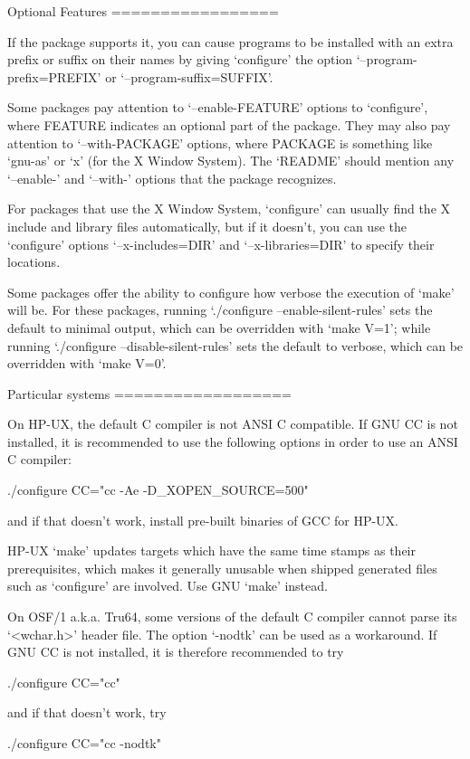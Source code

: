 \begin{DoxyVerbInclude}
Optional Features
=================

   If the package supports it, you can cause programs to be installed
with an extra prefix or suffix on their names by giving `configure' the
option `--program-prefix=PREFIX' or `--program-suffix=SUFFIX'.

   Some packages pay attention to `--enable-FEATURE' options to
`configure', where FEATURE indicates an optional part of the package.
They may also pay attention to `--with-PACKAGE' options, where PACKAGE
is something like `gnu-as' or `x' (for the X Window System).  The
`README' should mention any `--enable-' and `--with-' options that the
package recognizes.

   For packages that use the X Window System, `configure' can usually
find the X include and library files automatically, but if it doesn't,
you can use the `configure' options `--x-includes=DIR' and
`--x-libraries=DIR' to specify their locations.

   Some packages offer the ability to configure how verbose the
execution of `make' will be.  For these packages, running `./configure
--enable-silent-rules' sets the default to minimal output, which can be
overridden with `make V=1'; while running `./configure
--disable-silent-rules' sets the default to verbose, which can be
overridden with `make V=0'.

Particular systems
==================

   On HP-UX, the default C compiler is not ANSI C compatible.  If GNU
CC is not installed, it is recommended to use the following options in
order to use an ANSI C compiler:

     ./configure CC="cc -Ae -D_XOPEN_SOURCE=500"

and if that doesn't work, install pre-built binaries of GCC for HP-UX.

   HP-UX `make' updates targets which have the same time stamps as
their prerequisites, which makes it generally unusable when shipped
generated files such as `configure' are involved.  Use GNU `make'
instead.

   On OSF/1 a.k.a. Tru64, some versions of the default C compiler cannot
parse its `<wchar.h>' header file.  The option `-nodtk' can be used as
a workaround.  If GNU CC is not installed, it is therefore recommended
to try

     ./configure CC="cc"

and if that doesn't work, try

     ./configure CC="cc -nodtk"


\end{DoxyVerbInclude}
